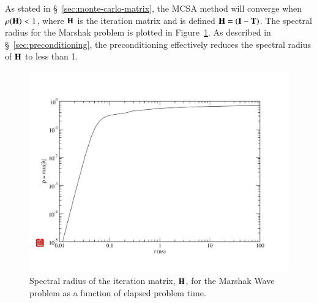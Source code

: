 \documentclass[preprint,12pt]{elsarticle}
\newcommand{\vI}{\ensuremath{\ve{I}}}
\begin{document}
As stated in \S~\ref{sec:monte-carlo-matrix}, the MCSA method will converge
when $\rho(\mathbf{H})< 1$, where $\mathbf{H}$ is the iteration matrix and is defined
$\ve{H} = (\vI - \ve{T})$.  The spectral radius for the Marshak problem is
plotted in Figure~\ref{fig:marshak_spectral}.  As described in
\S~\ref{sec:preconditioning}, the preconditioning effectively reduces the
spectral radius of $\mathbf{H}$ to less than 1.
\begin{figure}[ht!]
  \centerline{ \includegraphics[width=5in,clip]{spectral_radius.pdf}}
  \caption{Spectral radius of the iteration matrix, $\mathbf{H}$, for the
    Marshak Wave problem as a function of elapsed problem time.}
  \label{fig:marshak_spectral}
\end{figure}
\end{document}
